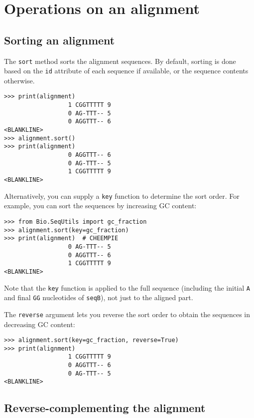 \section{Operations on an alignment}

\subsection{Sorting an alignment}

The \verb+sort+ method sorts the alignment sequences. By default, sorting is done based on the \verb+id+ attribute of each sequence if available, or the sequence contents otherwise.
\begin{verbatim}
>>> print(alignment)
                  1 CGGTTTTT 9
                  0 AG-TTT-- 5
                  0 AGGTTT-- 6
<BLANKLINE>
>>> alignment.sort()
>>> print(alignment)
                  0 AGGTTT-- 6
                  0 AG-TTT-- 5
                  1 CGGTTTTT 9
<BLANKLINE>
\end{verbatim}
Alternatively, you can supply a \verb+key+ function to determine the sort order. For example, you can sort the sequences by increasing GC content:
\begin{verbatim}
>>> from Bio.SeqUtils import gc_fraction
>>> alignment.sort(key=gc_fraction)
>>> print(alignment)  # CHEEMPIE
                  0 AG-TTT-- 5
                  0 AGGTTT-- 6
                  1 CGGTTTTT 9
<BLANKLINE>
\end{verbatim}
Note that the \verb+key+ function is applied to the full sequence (including the initial \verb|A| and final \verb|GG| nucleotides of \verb|seqB|), not just to the aligned part.

The \verb+reverse+ argument lets you reverse the sort order to obtain the sequences in decreasing GC content:
\begin{verbatim}
>>> alignment.sort(key=gc_fraction, reverse=True)
>>> print(alignment)
                  1 CGGTTTTT 9
                  0 AGGTTT-- 6
                  0 AG-TTT-- 5
<BLANKLINE>
\end{verbatim}

\subsection{Reverse-complementing the alignment}


